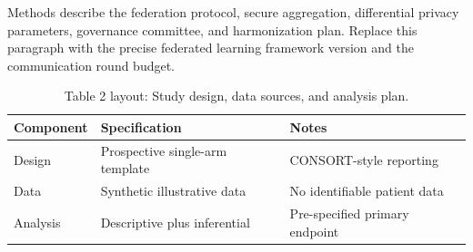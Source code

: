 
Methods describe the federation protocol, secure aggregation, differential privacy parameters, governance committee, and harmonization plan. Replace this paragraph with the precise federated learning framework version and the communication round budget.

\begin{table}[H]
\caption{Table 2 layout: Study design, data sources, and analysis plan.}
\label{tab:methods_design}
\centering
\begin{tabular}{>{\raggedright\arraybackslash}p{3.4cm} >{\raggedright\arraybackslash}p{4.6cm} >{\raggedright\arraybackslash}p{5.4cm}}
\toprule
\textbf{Component} & \textbf{Specification} & \textbf{Notes} \\
\midrule
  Design & Prospective single-arm template & CONSORT-style reporting \\
  Data & Synthetic illustrative data & No identifiable patient data \\
  Analysis & Descriptive plus inferential & Pre-specified primary endpoint \\
\bottomrule
\end{tabular}
\end{table}
